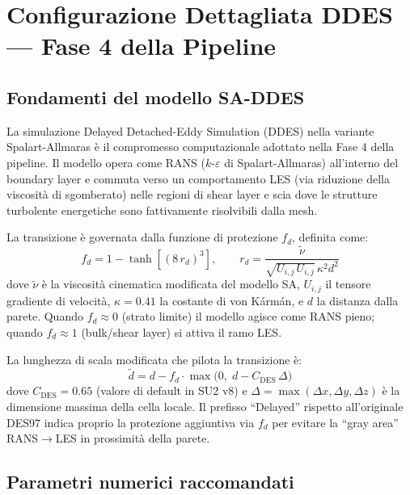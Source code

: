 \documentclass[11pt,a4paper]{article}
\begin{document}
\clearpage

\tableofcontents
\clearpage

\section{Configurazione Dettagliata DDES — Fase 4 della Pipeline}
\label{sec:ddes}

\subsection{Fondamenti del modello SA-DDES}

La simulazione Delayed Detached-Eddy Simulation (DDES) nella variante
Spalart-Allmaras \cite{spalart2006} è il compromesso computazionale adottato
nella Fase 4 della pipeline. Il modello opera come RANS ($k$-$\varepsilon$ di
Spalart-Allmaras) all'interno del boundary layer e commuta verso un comportamento
LES (via riduzione della viscosità di sgomberato) nelle regioni di shear layer
e scia dove le strutture turbolente energetiche sono fattivamente risolvibili
dalla mesh.

La transizione è governata dalla funzione di protezione $f_d$, definita come:
\[
  f_d = 1 - \tanh\!\left[(8\,r_d)^3\right],
  \qquad
  r_d = \frac{\tilde{\nu}}{\sqrt{U_{i,j}\,U_{i,j}}\,\kappa^2 d^2}
\]
dove $\tilde{\nu}$ è la viscosità cinematica modificata del modello SA, $U_{i,j}$
il tensore gradiente di velocità, $\kappa = 0.41$ la costante di von Kármán,
e $d$ la distanza dalla parete.
Quando $f_d \approx 0$ (strato limite) il modello agisce come RANS pieno;
quando $f_d \approx 1$ (bulk/shear layer) si attiva il ramo LES.

La lunghezza di scala modificata che pilota la transizione è:
\[
  \tilde{d} = d - f_d \cdot \max\!\bigl(0,\; d - C_\mathrm{DES}\,\Delta\bigr)
\]
dove $C_\mathrm{DES} = 0.65$ (valore di default in SU2 v8) e
$\Delta = \max(\Delta x, \Delta y, \Delta z)$ è la dimensione massima
della cella locale. Il prefisso ``Delayed'' rispetto all'originale DES97
indica proprio la protezione aggiuntiva via $f_d$ per evitare la ``gray area''
RANS$\to$LES in prossimità della parete.

\subsection{Parametri numerici raccomandati}
\end{document}
